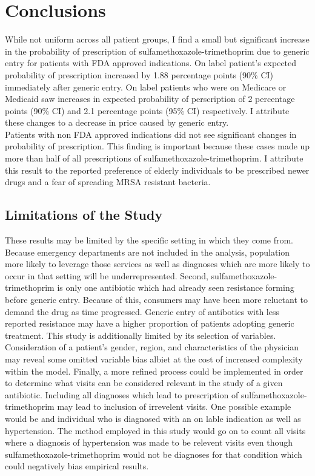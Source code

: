 \chapter{Conclusions}
While not uniform across all patient groups, I find a small but significant increase in the probability of prescription of sulfamethoxazole-trimethoprim due to generic entry for patients with FDA approved indications. On label patient's expected probability of prescription increased by 1.88 percentage points (90\% CI) immediately after generic entry. On label patients who were on Medicare or Medicaid saw increases in expected probability of perscription of 2 percentage points (90\% CI) and 2.1 percentage points (95\% CI) respectively. I attribute these changes to a decrease in price caused by generic entry.\\
\indent Patients with non FDA approved indications did not see significant changes in probability of prescription. This finding is important because these cases made up more than half of all prescriptions of sulfamethoxazole-trimethoprim. I attribute this result to the reported preference of elderly individuals to be prescribed newer drugs and a fear of spreading MRSA resistant bacteria.

\section{Limitations of the Study}
These results may be limited by the specific setting in which they come from. Because emergency departments are not included in the analysis, population more likely to leverage those services as well as diagnoses which are more likely to occur in that setting will be underrepresented. Second, sulfamethoxazole-trimethoprim is only one antibiotic which had already seen resistance forming before generic entry. Because of this, consumers may have been more reluctant to demand the drug as time progressed. Generic entry of antibotics with less reported resistance may have a higher proportion of patients adopting generic treatment. This study is additionally limited by its selection of variables. Consideration of a patient's gender, region, and characteristics of the physician may reveal some omitted variable bias albiet at the cost of increased complexity within the model. Finally, a more refined process could be implemented in order to determine what visits can be considered relevant in the study of a given antibiotic. Including all diagnoses which lead to prescription of sulfamethoxazole-trimethoprim may lead to inclusion of irrevelent visits. One possible example would be and individual who is diagnosed with an on lable indication as well as hypertension. The method employed in this study would go on to count all visits where a diagnosis of hypertension was made to be relevent visits even though sulfamethoxazole-trimethoprim would not be diagnoses for that condition which could negatively bias empirical results. 


